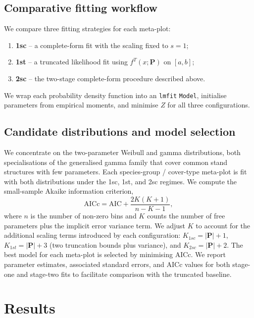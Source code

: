 \documentclass[12pt]{article}
\begin{document}
\subsection{Comparative fitting workflow}
\label{sec:methods_benchmark}

We compare three fitting strategies for each meta-plot:
\begin{enumerate}
  \item \textbf{1sc} -- a complete-form fit with the scaling fixed to $s = 1$;
  \item \textbf{1st} -- a truncated likelihood fit using $f^{T}(x; \bm{P})$ on $[a, b]$;
  \item \textbf{2sc} -- the two-stage complete-form procedure described above.
\end{enumerate}
We wrap each probability density function into an \texttt{lmfit} \texttt{Model}, initialise parameters from empirical moments, and minimise $Z$ for all three configurations.

\subsection{Candidate distributions and model selection}
\label{sec:methods_candidates}

We concentrate on the two-parameter Weibull and gamma distributions, both specialisations of the generalised gamma family that cover common stand structures with few parameters. Each species-group / cover-type meta-plot is fit with both distributions under the 1sc, 1st, and 2sc regimes. We compute the small-sample Akaike information criterion,
\begin{equation}
  \text{AICc} = \text{AIC} + \frac{2K(K+1)}{n - K - 1},
\end{equation}
where $n$ is the number of non-zero bins and $K$ counts the number of free parameters plus the implicit error variance term. We adjust $K$ to account for the additional scaling terms introduced by each configuration: $K_{1sc} = |\bm{P}| + 1$, $K_{1st} = |\bm{P}| + 3$ (two truncation bounds plus variance), and $K_{2sc} = |\bm{P}| + 2$. The best model for each meta-plot is selected by minimising AICc. We report parameter estimates, associated standard errors, and AICc values for both stage-one and stage-two fits to facilitate comparison with the truncated baseline.

\section{Results}
\label{sec:results}
\end{document}
